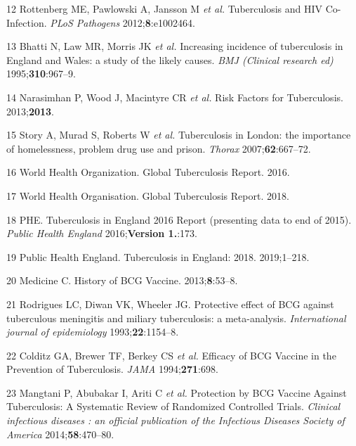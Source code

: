 \documentclass[11pt,twoside]{bristolthesis}
\begin{document}
  \leavevmode\hypertarget{ref-Rottenberg2012}{}%
  12 Rottenberg ME, Pawlowski A, Jansson M \emph{et al.} Tuberculosis and HIV Co-Infection. \emph{PLoS Pathogens} 2012;\textbf{8}:e1002464.
  
  \leavevmode\hypertarget{ref-Bhatti1995}{}%
  13 Bhatti N, Law MR, Morris JK \emph{et al.} Increasing incidence of tuberculosis in England and Wales: a study of the likely causes. \emph{BMJ (Clinical research ed)} 1995;\textbf{310}:967--9.
  
  \leavevmode\hypertarget{ref-Narasimhan2013}{}%
  14 Narasimhan P, Wood J, Macintyre CR \emph{et al.} Risk Factors for Tuberculosis. 2013;\textbf{2013}.
  
  \leavevmode\hypertarget{ref-Story2007}{}%
  15 Story A, Murad S, Roberts W \emph{et al.} Tuberculosis in London: the importance of homelessness, problem drug use and prison. \emph{Thorax} 2007;\textbf{62}:667--72.
  
  \leavevmode\hypertarget{ref-WHOTB2016}{}%
  16 World Health Organization. Global Tuberculosis Report. 2016.
  
  \leavevmode\hypertarget{ref-WHO:2018}{}%
  17 World Health Organisation. Global Tuberculosis Report. 2018.
  
  \leavevmode\hypertarget{ref-PHE2016a}{}%
  18 PHE. Tuberculosis in England 2016 Report (presenting data to end of 2015). \emph{Public Health England} 2016;\textbf{Version 1.}:173.
  
  \leavevmode\hypertarget{ref-PHE2018}{}%
  19 Public Health England. Tuberculosis in England: 2018. 2019;1--218.
  
  \leavevmode\hypertarget{ref-Medicine2013}{}%
  20 Medicine C. History of BCG Vaccine. 2013;\textbf{8}:53--8.
  
  \leavevmode\hypertarget{ref-Rodrigues1993}{}%
  21 Rodrigues LC, Diwan VK, Wheeler JG. Protective effect of BCG against tuberculous meningitis and miliary tuberculosis: a meta-analysis. \emph{International journal of epidemiology} 1993;\textbf{22}:1154--8.
  
  \leavevmode\hypertarget{ref-Colditz1994}{}%
  22 Colditz GA, Brewer TF, Berkey CS \emph{et al.} Efficacy of BCG Vaccine in the Prevention of Tuberculosis. \emph{JAMA} 1994;\textbf{271}:698.
  
  \leavevmode\hypertarget{ref-Mangtani2014a}{}%
  23 Mangtani P, Abubakar I, Ariti C \emph{et al.} Protection by BCG Vaccine Against Tuberculosis: A Systematic Review of Randomized Controlled Trials. \emph{Clinical infectious diseases : an official publication of the Infectious Diseases Society of America} 2014;\textbf{58}:470--80.
  
\end{document}
